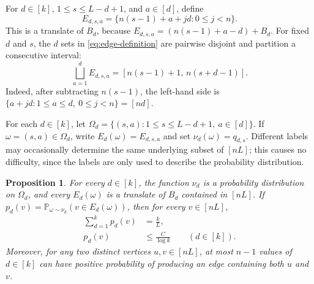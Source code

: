 \documentclass[10pt,a4paper]{amsart}
\numberwithin{equation}{section}
\newtheorem{proposition}[theorem]{Proposition}
\newcommand{\Prob}{\mathbb{P}}
\begin{document}
For $d\in[k]$, $1\le s\le L-d+1$, and $a\in[d]$, define
\begin{equation}\label{eq:edge-definition}
        E_{d,s,a}=\{n(s-1)+a+jd:0\le j<n\}.
\end{equation}
This is a translate of $B_d$, because $E_{d,s,a}=(n(s-1)+a-d)+B_d$.  For fixed
$d$ and $s$, the $d$ sets in \eqref{eq:edge-definition} are pairwise disjoint
and partition a consecutive interval:
\begin{equation}\label{eq:bundle-partition}
        \bigsqcup_{a=1}^d E_{d,s,a}
        =[n(s-1)+1,\,n(s+d-1)].
\end{equation}
Indeed, after subtracting $n(s-1)$, the left-hand side is
$\{a+jd:1\le a\le d,\ 0\le j<n\}=[nd]$.

For each $d\in[k]$, let $\Omega_d=\{(s,a):1\le s\le L-d+1,\ a\in[d]\}$.  If
$\omega=(s,a)\in\Omega_d$, write $E_d(\omega)=E_{d,s,a}$ and set
$\nu_d(\omega)=q_{d,s}$.  Different labels may occasionally determine the same
underlying subset of $[nL]$; this causes no difficulty, since the labels are
only used to describe the probability distribution.

\begin{proposition}\label{prop:fractional-AP}
For every $d\in[k]$, the function $\nu_d$ is a probability distribution on
$\Omega_d$, and every $E_d(\omega)$ is a translate of $B_d$ contained in
$[nL]$.  If $p_d(v)=\Prob_{\omega\sim\nu_d}(v\in E_d(\omega))$, then for every
$v\in[nL]$,
\begin{align}
        \sum_{d=1}^k p_d(v)&=\frac{k}{L},\label{eq:actual-load}\\
        p_d(v)&\le\frac{C}{\log k}\qquad(d\in[k]).\label{eq:actual-diffuse}
\end{align}
Moreover, for any two distinct vertices $u,v\in[nL]$, at most $n-1$ values of
$d\in[k]$ can have positive probability of producing an edge containing both
$u$ and $v$.
\end{proposition}
\end{document}
